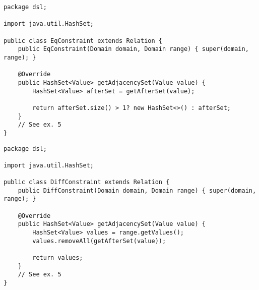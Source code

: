 \bgroup
{}
\begin{lstlisting}[caption=EqConstraint.java, label=lst:eq]
package dsl;

import java.util.HashSet;

public class EqConstraint extends Relation {
    public EqConstraint(Domain domain, Domain range) { super(domain, range); }

    @Override
    public HashSet<Value> getAdjacencySet(Value value) {
        HashSet<Value> afterSet = getAfterSet(value);

        return afterSet.size() > 1? new HashSet<>() : afterSet;
    }
    // See ex. 5
}
\end{lstlisting}
\egroup

\bgroup
{}
\begin{lstlisting}[caption=DiffConstraint.java, label=lst:diff]
package dsl;

import java.util.HashSet;

public class DiffConstraint extends Relation {
    public DiffConstraint(Domain domain, Domain range) { super(domain, range); }

    @Override
    public HashSet<Value> getAdjacencySet(Value value) {
        HashSet<Value> values = range.getValues();
        values.removeAll(getAfterSet(value));

        return values;
    }
    // See ex. 5
}
\end{lstlisting}
\egroup

% 
% 
% 
% 
